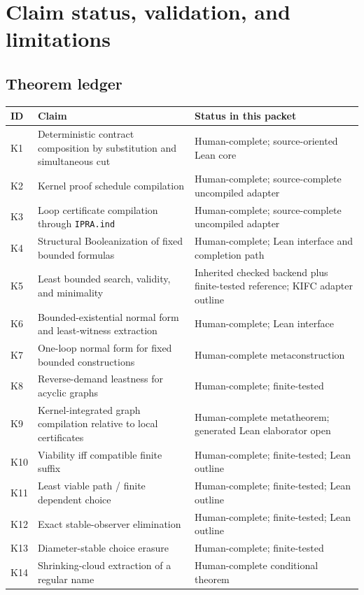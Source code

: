 \section{Claim status, validation, and limitations}
\label{sec:status}

\subsection{Theorem ledger}

\begin{longtable}{@{}p{}p{}p{}@{}}
\toprule
ID & Claim & Status in this packet \\
\midrule
\endhead
K1 & Deterministic contract composition by substitution and simultaneous cut & Human-complete; source-oriented Lean core \\
K2 & Kernel proof schedule compilation & Human-complete; source-complete uncompiled adapter \\
K3 & Loop certificate compilation through \texttt{IPRA.ind} & Human-complete; source-complete uncompiled adapter \\
K4 & Structural Booleanization of fixed bounded formulas & Human-complete; Lean interface and completion path \\
K5 & Least bounded search, validity, and minimality & Inherited checked backend plus finite-tested reference; KIFC adapter outline \\
K6 & Bounded-existential normal form and least-witness extraction & Human-complete; Lean interface \\
K7 & One-loop normal form for fixed bounded constructions & Human-complete metaconstruction \\
K8 & Reverse-demand leastness for acyclic graphs & Human-complete; finite-tested \\
K9 & Kernel-integrated graph compilation relative to local certificates & Human-complete metatheorem; generated Lean elaborator open \\
K10 & Viability iff compatible finite suffix & Human-complete; finite-tested; Lean outline \\
K11 & Least viable path / finite dependent choice & Human-complete; finite-tested; Lean outline \\
K12 & Exact stable-observer elimination & Human-complete; finite-tested; Lean outline \\
K13 & Diameter-stable choice erasure & Human-complete; finite-tested \\
K14 & Shrinking-cloud extraction of a regular name & Human-complete conditional theorem \\

\end{longtable}

